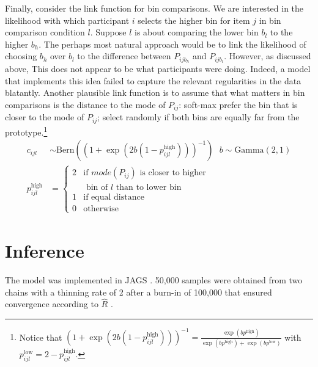 \documentclass[10pt,letterpaper]{article}
\begin{document}
Finally, consider the link function for bin comparisons. We are interested in the likelihood
with which participant $i$ selects the higher bin for item $j$ in bin comparison condition
$l$. Suppose $l$ is about comparing the lower bin $b_l$ to the higher $b_h$. The perhaps most
natural approach would be to link the likelihood of choosing $b_h$ over $b_l$ to the difference
between $P_{ijb_h}$ and $P_{ijb_l}$. However, as discussed above, This does not appear to be
what participants were doing. Indeed, a model that implements this idea failed to capture the
relevant regularities in the data blatantly. Another plausible link function is to assume that
what matters in bin comparisons is the distance to the mode of $P_{ij}$: soft-max prefer the
bin that is closer to the mode of $P_{ij}$; select randomly if both bins are equally far from
the prototype.\footnote{Notice that
  $(1 + \exp(2b(1-p^{\text{high}}_{ijl})) )^{-1} = \frac{\exp(b p^{\text{high}})}{\exp(b
    p^{\text{high}}) + \exp(b p^{\text{low}})}$
  with $p^\text{low}_{ijl} = 2 - p^\text{high}_{ijl}$.}
\begin{align*}
  c_{ijl} & \sim \text{Bern}( (1 + \exp(2b(1-p^{\text{high}}_{ijl})) )^{-1} ) \ \ \ 
  b  \sim \text{Gamma}(2,1) \\
  p^\text{high}_{ijl} & = \begin{cases}
    2 & \text{if $mode(P_{ij})$ is closer to higher} \\
    & \text{ bin of $l$ than to lower bin } \\ 1 & \text{if equal
      distance} \\ 0 & \text{otherwise}  
  \end{cases}
\end{align*}

\section{Inference}

The model was implemented in JAGS \cite{Plummer2003:JAGS:-A-Program}. 50,000 samples were
obtained from two chains with a thinning rate of 2 after a burn-in of 100,000 that ensured
convergence according to $\hat{R}$ \cite{GelmanRubin1992:Inference-from-}.
\end{document}
